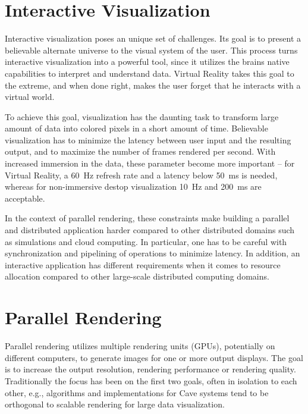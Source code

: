 \section{Interactive Visualization}

Interactive visualization poses an unique set of challenges. Its goal is to
present a believable alternate universe to the visual system of the user. This
process turns interactive visualization into a powerful tool, since it utilizes
the brains native capabilities to interpret and understand data. Virtual
Reality takes this goal to the extreme, and when done right, makes the user
forget that he interacts with a virtual world.

To achieve this goal, visualization has the daunting task to transform large
amount of data into colored pixels in a short amount of time. Believable
visualization has to minimize the latency between user input and the resulting
output, and to maximize the number of frames rendered per second. With
increased immersion in the data, these parameter become more important --
for Virtual Reality, a 60~Hz refresh rate and a latency below 50~ms is needed,
whereas for non-immersive destop visualization 10~Hz and 200~ms are acceptable.

In the context of parallel rendering, these constraints make building a
parallel and distributed application harder compared to other distributed
domains such as simulations and cloud computing. In particular, one has to be
careful with synchronization and pipelining of operations to minimize latency.
In addition, an interactive application has different requirements when it comes
to resource allocation compared to other large-scale distributed computing
domains.

\section{Parallel Rendering}

Parallel rendering utilizes multiple rendering units (GPUs), potentially on
different computers, to generate images for one or more output displays. The
goal is to increase the output resolution, rendering performance or rendering
quality. Traditionally the focus has been on the first two goals, often in
isolation to each other, e.g., algorithms and implementations for Cave systems
tend to be orthogonal to scalable rendering for large data visualization.

